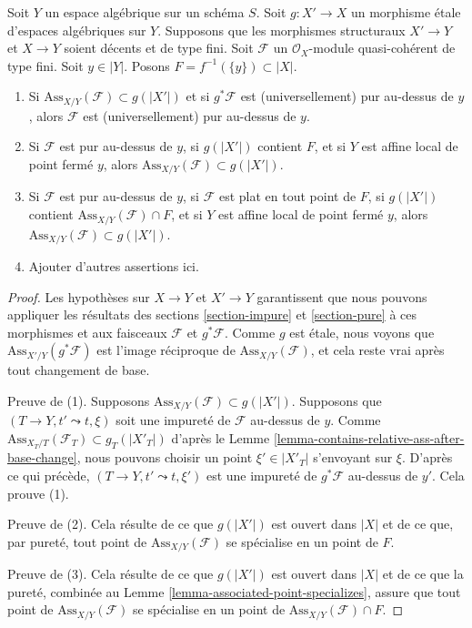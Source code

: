 \begin{lemma}
\label{lemma-pure-on-top}
Soit $Y$ un espace algébrique sur un schéma $S$. Soit $g : X' \to X$ un
morphisme \'etale d'espaces algébriques sur $Y$. Supposons que les morphismes
structuraux $X' \to Y$ et $X \to Y$ soient décents et de type fini.
Soit $\mathcal{F}$ un $\mathcal{O}_X$-module quasi-cohérent de type fini.
Soit $y \in |Y|$. Posons $F = f^{-1}(\{y\}) \subset |X|$.
\begin{enumerate}
\item Si $\text{Ass}_{X/Y}(\mathcal{F}) \subset g(|X'|)$
et si $g^*\mathcal{F}$ est (universellement) pur au-dessus de $y$, alors
$\mathcal{F}$ est (universellement) pur au-dessus de $y$.
\item Si $\mathcal{F}$ est pur au-dessus de $y$, si $g(|X'|)$ contient $F$, et si
$Y$ est affine local de point fermé $y$, alors
$\text{Ass}_{X/Y}(\mathcal{F}) \subset g(|X'|)$.
\item Si $\mathcal{F}$ est pur au-dessus de $y$, si $\mathcal{F}$ est plat
en tout point de $F$, si $g(|X'|)$ contient
$\text{Ass}_{X/Y}(\mathcal{F}) \cap F$, et si $Y$ est affine local
de point fermé $y$, alors
$\text{Ass}_{X/Y}(\mathcal{F}) \subset g(|X'|)$.
\item Ajouter d'autres assertions ici.
\end{enumerate}
\end{lemma}

\begin{proof}
Les hypothèses sur $X \to Y$ et $X' \to Y$ garantissent que
nous pouvons appliquer les résultats des sections \ref{section-impure} et
\ref{section-pure}
à ces morphismes et aux faisceaux $\mathcal{F}$ et $g^*\mathcal{F}$.
Comme $g$ est \'etale, nous voyons que
$\text{Ass}_{X'/Y}(g^*\mathcal{F})$
est l'image réciproque de $\text{Ass}_{X/Y}(\mathcal{F})$,
et cela reste vrai après tout changement de base.

\medskip\noindent
Preuve de (1). Supposons $\text{Ass}_{X/Y}(\mathcal{F}) \subset g(|X'|)$.
Supposons que $(T \to Y, t' \leadsto t, \xi)$
soit une impureté de $\mathcal{F}$ au-dessus de $y$. Comme
$\text{Ass}_{X_T/T}(\mathcal{F}_T) \subset g_T(|X'_T|)$ d'après
le Lemme \ref{lemma-contains-relative-ass-after-base-change}, nous pouvons
choisir
un point $\xi' \in |X'_T|$ s'envoyant sur $\xi$. D'après ce qui précède,
$(T \to Y, t' \leadsto t, \xi')$ est une impureté de
$g^*\mathcal{F}$ au-dessus de $y'$. Cela prouve (1).

\medskip\noindent
Preuve de (2). Cela résulte de ce que $g(|X'|)$ est ouvert
dans $|X|$ et de ce que, par pureté, tout point de
$\text{Ass}_{X/Y}(\mathcal{F})$ se spécialise en un point de $F$.

\medskip\noindent
Preuve de (3). Cela résulte de ce que $g(|X'|)$ est ouvert
dans $|X|$ et de ce que la pureté, combinée au
Lemme \ref{lemma-associated-point-specializes}, assure que tout point de
$\text{Ass}_{X/Y}(\mathcal{F})$ se spécialise en un point de
$\text{Ass}_{X/Y}(\mathcal{F}) \cap F$.
\end{proof}

